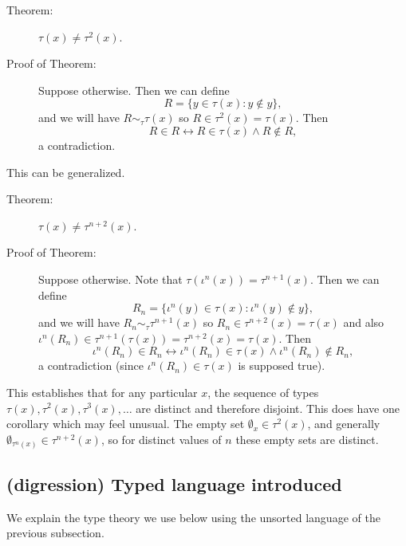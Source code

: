 \documentclass[12pt]{book}
\begin{document}
\begin{description}

\item[Theorem:]  $\tau(x) \neq \tau^2(x)$.

\item[Proof of Theorem:]  Suppose otherwise.  Then we can define $$R = \{y \in \tau(x):y \not\in y\},$$ and we will have $R \sim_\tau \tau(x)$ so $R \in \tau^2(x) = \tau(x)$.
Then $$R \in R \leftrightarrow R \in \tau(x) \wedge R \not\in R,$$ a contradiction.

\end{description}

This can be generalized.

\begin{description}

\item[Theorem:]  $\tau(x) \neq \tau^{n+2}(x)$.

\item[Proof of Theorem:]  Suppose otherwise.  Note that $\tau(\iota^n(x)) = \tau^{n+1}(x)$.  Then we can define $$R_n = \{\iota^n(y) \in \tau(x):\iota^n(y) \not\in y\},$$ and we will have $R_n \sim_\tau \tau^{n+1}(x)$ so $R_n \in \tau^{n+2}(x) = \tau(x)$ and also $\iota^n(R_n) \in \tau^{n+1}(\tau(x)) = \tau^{n+2}(x) = \tau(x)$.
Then $$\iota^n(R_n) \in R_n \leftrightarrow \iota^n(R_n) \in \tau(x) \wedge \iota^n(R_n) \not\in R_n,$$ a contradiction (since $\iota^n(R_n) \in \tau(x)$ is supposed true). 

\end{description}

This establishes that for any particular $x$, the sequence of types $\tau(x), \tau^2(x),\tau^3(x),\ldots$ are distinct and therefore disjoint.  This does have one corollary which may feel unusual.  The empty set $\emptyset_x \in \tau^2(x)$, and generally $\emptyset_{\tau^n(x)} \in \tau^{n+2}(x)$, so for distinct values of $n$ these empty sets are distinct.

\subsection{ (digression) Typed language introduced}

We explain the type theory we use below using the unsorted language of the previous subsection.
\end{document}
